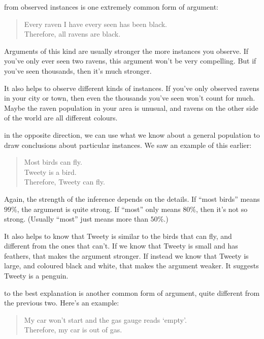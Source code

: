 \documentclass[justified]{tufte-book}
\newenvironment{argument}{\begin{quote}\normalsize}{\end{quote}}
\theoremstyle{definition}
\theoremstyle{definition}
\theoremstyle{definition}
\theoremstyle{remark}
\begin{document}
 from observed instances is one extremely common form of argument:

\begin{argument}
Every raven I have every seen has been black.\\
Therefore, all ravens are black.
\end{argument}

Arguments of this kind are usually stronger the more instances you observe. If you've only ever seen two ravens, this argument won't be very compelling. But if you've seen thousands, then it's much stronger.

It also helps to observe different kinds of instances. If you've only observed ravens in your city or town, then even the thousands you've seen won't count for much. Maybe the raven population in your area is unusual, and ravens on the other side of the world are all different colours.

 in the opposite direction, we can use what we know about a general population to draw conclusions about particular instances. We saw an example of this earlier:

\begin{argument}
Most birds can fly.\\
Tweety is a bird.\\
Therefore, Tweety can fly.
\end{argument}

Again, the strength of the inference depends on the details. If ``most birds'' means \(99\%\), the argument is quite strong. If ``most'' only means \(80\%\), then it's not so strong. (Usually ``most'' just means more than \(50\%\).)

It also helps to know that Tweety is similar to the birds that can fly, and different from the ones that can't. If we know that Tweety is small and has feathers, that makes the argument stronger. If instead we know that Tweety is large, and coloured black and white, that makes the argument weaker. It suggests Tweety is a penguin.

 to the best explanation is another common form of argument, quite different from the previous two. Here's an example:

\begin{argument}
My car won't start and the gas gauge reads `empty'.\\
Therefore, my car is out of gas.
\end{argument}
\end{document}
